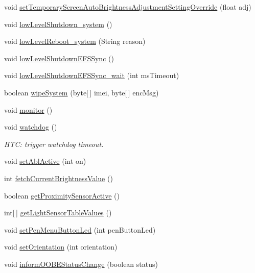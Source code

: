 \begin{DoxyCompactItemize}
void \hyperlink{classcom_1_1android_1_1server_1_1power_1_1PowerManagerService_ac6f361dfa708a4a0a96085f5117ef57a}{set\-Temporary\-Screen\-Auto\-Brightness\-Adjustment\-Setting\-Override} (float adj)
\item 
void \hyperlink{classcom_1_1android_1_1server_1_1power_1_1PowerManagerService_a3606a2b867c37574e88495a9839c65a8}{low\-Level\-Shutdown\-\_\-system} ()
\item 
void \hyperlink{classcom_1_1android_1_1server_1_1power_1_1PowerManagerService_a8ed23cef4d238b9c8079531213c3bb00}{low\-Level\-Reboot\-\_\-system} (String reason)
\item 
void \hyperlink{classcom_1_1android_1_1server_1_1power_1_1PowerManagerService_a199ecf0e643121b352dd497d5718049c}{low\-Level\-Shutdown\-E\-F\-S\-Sync} ()
\item 
void \hyperlink{classcom_1_1android_1_1server_1_1power_1_1PowerManagerService_a4dd8be1755b3f0cab3f8599e86379983}{low\-Level\-Shutdown\-E\-F\-S\-Sync\-\_\-wait} (int ms\-Timeout)
\item 
boolean \hyperlink{classcom_1_1android_1_1server_1_1power_1_1PowerManagerService_ae91981409b5fa94b9faaab5920f6c8ca}{wipe\-System} (byte\mbox{[}$\,$\mbox{]} imei, byte\mbox{[}$\,$\mbox{]} enc\-Msg)
\item 
void \hyperlink{classcom_1_1android_1_1server_1_1power_1_1PowerManagerService_ad0363a56b5777cd188abd1310bcd5fc2}{monitor} ()
\item 
void \hyperlink{classcom_1_1android_1_1server_1_1power_1_1PowerManagerService_a1980f91e957fd3661e615910f91b0778}{watchdog} ()
\begin{DoxyCompactList}\small\item\em H\-T\-C\-: trigger watchdog timeout. \end{DoxyCompactList}\item 
void \hyperlink{classcom_1_1android_1_1server_1_1power_1_1PowerManagerService_a5025e7fa3ab11ff7e6393430f4431989}{set\-Abl\-Active} (int on)
\item 
int \hyperlink{classcom_1_1android_1_1server_1_1power_1_1PowerManagerService_a9c8afb471b72eb9d448e1fc4a1649bbb}{fetch\-Current\-Brightness\-Value} ()
\item 
boolean \hyperlink{classcom_1_1android_1_1server_1_1power_1_1PowerManagerService_adf51be5faae092d09d844c34f57e2a50}{get\-Proximity\-Sensor\-Active} ()
\item 
int\mbox{[}$\,$\mbox{]} \hyperlink{classcom_1_1android_1_1server_1_1power_1_1PowerManagerService_a550a64aebe82e8c26233a2c334111aa2}{get\-Light\-Sensor\-Table\-Values} ()
\item 
void \hyperlink{classcom_1_1android_1_1server_1_1power_1_1PowerManagerService_a975fbb3607c855f15292e7a0e2896a80}{set\-Pen\-Menu\-Button\-Led} (int pen\-Button\-Led)
\item 
void \hyperlink{classcom_1_1android_1_1server_1_1power_1_1PowerManagerService_a70eb76239bdfc13c354eb17a1250bfb1}{set\-Orientation} (int orientation)
\item 
void \hyperlink{classcom_1_1android_1_1server_1_1power_1_1PowerManagerService_a2c37aeb0e678ef2884b9c19580f7834b}{inform\-O\-O\-B\-E\-Status\-Change} (boolean status)
\end{DoxyCompactItemize}
